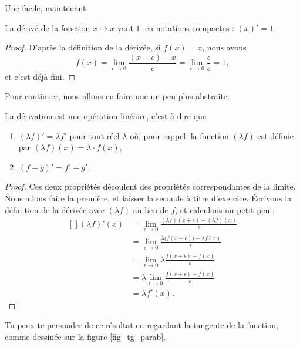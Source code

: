 \documentclass{article}
\begin{document}
Une facile, maintenant.
\begin{proposition}
	La dérivé de la fonction $x\mapsto x$ vaut $1$, en notations compactes : $(x)'=1$.
\end{proposition}

\begin{proof}
D'après la définition de la dérivée, si $f(x)=x$, nous avons
\begin{equation}
	f(x)=\lim_{\epsilon\to 0}\frac{ (x+\epsilon) -x }{\epsilon} =\lim_{\epsilon\to 0}\frac{ \epsilon }{\epsilon} =1,
\end{equation}
et c'est déjà fini.
\end{proof}

Pour continuer, nous allons en faire une un peu plus abstraite.
\begin{proposition}		\label{PropDerrLin}
	La dérivation est une opération linéaire, c'est à dire que
	\begin{enumerate}
		\item $(\lambda f)'=\lambda f'$ pour tout réel $\lambda$ où, pour rappel, la fonction $(\lambda f)$ est définie par $(\lambda f)(x)=\lambda\cdot f(x)$,
		\item $(f+g)'=f'+g'$.
	\end{enumerate}
\end{proposition}

\begin{proof}
Ces deux propriétés découlent des propriétés correspondantes de la limite. Nous allons faire la première, et laisser la seconde à titre d'exercice. Écrivons la définition de la dérivée avec $(\lambda f)$ au lieu de $f$, et calculons un petit peu :
\begin{equation}
	\begin{aligned}[]
		(\lambda f)'(x)	&=\lim_{\epsilon\to 0}\frac{ (\lambda f)(x+\epsilon)-(\lambda f)(x) }{ \epsilon }\\
				&=\lim_{\epsilon\to 0}\frac{ \lambda \big( f(x+\epsilon) \big)-\lambda f(x) }{ \epsilon }\\
				&=\lim_{\epsilon\to 0}\lambda \frac{ f(x+\epsilon) -f(x) }{ \epsilon }\\
				&=\lambda \lim_{\epsilon\to 0}\frac{ f(x+\epsilon) -f(x) }{ \epsilon }\\
				&=\lambda f'(x).
	\end{aligned}
\end{equation}
\end{proof}

Tu peux te persuader de ce résultat en regardant la tangente de la fonction, comme dessinée sur la figure \ref{fig_tg_parab}.

\end{document}
